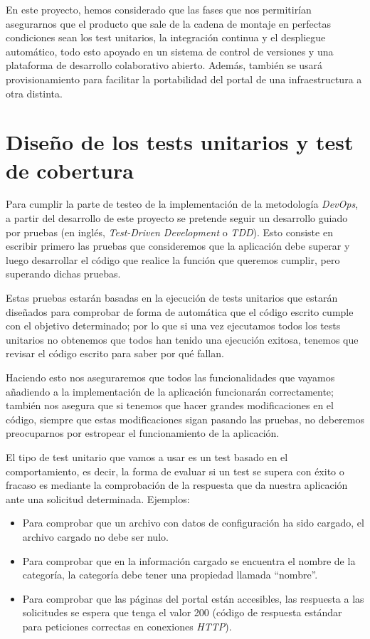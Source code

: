 \bigskip
En este proyecto, hemos considerado que las fases que nos permitirían asegurarnos que el producto que sale de la cadena de montaje en perfectas condiciones sean los test unitarios, la integración continua y el despliegue automático, todo esto apoyado en un sistema de control de versiones y una plataforma de desarrollo colaborativo abierto. Además, también se usará provisionamiento para facilitar la portabilidad del portal de una infraestructura a otra distinta. 

\section{Diseño de los tests unitarios y test de cobertura}

Para cumplir la parte de testeo de la implementación de la metodología \textit{DevOps}, a partir del desarrollo de este proyecto se pretende seguir un desarrollo guiado por pruebas (en inglés, \textit{Test-Driven Development} o \textit{TDD}). Esto consiste en escribir primero las pruebas que consideremos que la aplicación debe superar y luego desarrollar el código que realice la función que queremos cumplir, pero superando dichas pruebas. 

\bigskip
Estas pruebas estarán basadas en la ejecución de tests unitarios que estarán diseñados para comprobar de forma de automática que el código escrito cumple con el objetivo determinado; por lo que si una vez ejecutamos todos los tests unitarios no obtenemos que todos han tenido una ejecución exitosa, tenemos que revisar el código escrito para saber por qué fallan.

\bigskip
Haciendo esto nos aseguraremos que todos las funcionalidades que vayamos añadiendo a la implementación de la aplicación funcionarán correctamente; también nos asegura que si tenemos que hacer grandes modificaciones en el código, siempre que estas modificaciones sigan pasando las pruebas, no deberemos preocuparnos por estropear el funcionamiento de la aplicación.

\bigskip
El tipo de test unitario que vamos a usar es un test basado en el comportamiento, es decir, la forma de evaluar si un test se supera con éxito o fracaso es mediante la comprobación de la respuesta que da nuestra aplicación ante una solicitud 
determinada. Ejemplos:

\begin{itemize}
 \item Para comprobar que un archivo con datos de configuración ha sido cargado, el archivo cargado no debe ser nulo.
 \item Para comprobar que en la información cargado se encuentra el nombre de la categoría, la categoría debe tener una propiedad llamada ``nombre''.
 \item Para comprobar que las páginas del portal están accesibles, las respuesta a las solicitudes se espera que tenga el valor 200 (código de respuesta estándar para peticiones correctas en conexiones \textit{HTTP}).
\end{itemize}

